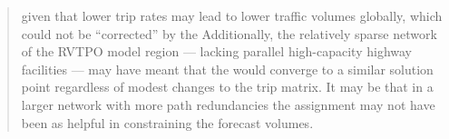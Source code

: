 \documentclass{ar2rc}
\begin{document}
\begin{quote}
    given that
    lower trip rates may lead to lower traffic volumes globally, which could
    not be ``corrected'' by the \DIFdelbegin {}\DIFdelend \DIFaddbegin {}\DIFaddend Additionally, the relatively sparse network of the RVTPO model region
    --- lacking parallel high-capacity highway facilities --- may have meant
    that the \DIFdelbegin {}\DIFdelend \DIFaddbegin {}\DIFaddend would converge to a similar solution
    point regardless of modest changes to the trip matrix. \DIFaddbegin {}\DIFaddend It may be that in
    a larger network with more path redundancies \DIFdelbegin \DIFdel{, }\DIFdelend \DIFaddbegin {}\DIFaddend the assignment may not have been as helpful in constraining the forecast
    volumes.
\end{quote}
\end{document}
